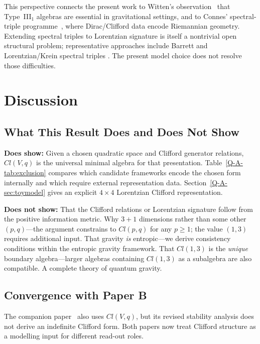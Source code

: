 \documentclass[12pt,a4paper,openany]{book}
\begin{document}
This perspective connects the present work to Witten's observation~\cite{Witten2018} that Type~III$_1$ algebras are essential in gravitational settings, and to Connes' spectral-triple programme~\cite{Connes1994}, where Dirac/Clifford data encode Riemannian geometry.  Extending spectral triples to Lorentzian signature is itself a nontrivial open structural problem; representative approaches include Barrett and Lorentzian/Krein spectral triples \cite{Barrett2007,PaschkeSitarz2006,VandenDungen2016}.  The present model choice does not resolve those difficulties.

\section{Discussion}
\label{Q-A-sec:discussion}

\subsection{What This Result Does and Does Not Show}

\textbf{Does show:}
Given a chosen quadratic space and Clifford generator relations, $Cl(V,q)$ is the universal minimal algebra for that presentation.
Table~\ref{Q-A-tab:exclusion} compares which candidate frameworks encode the chosen form internally and which require external representation data.
Section~\ref{Q-A-sec:toymodel} gives an explicit $4\times4$ Lorentzian Clifford representation.

\textbf{Does not show:}
That the Clifford relations or Lorentzian signature follow from the positive information metric.
Why $3+1$ dimensions rather than some other $(p,q)$---the argument constrains to $Cl(p,q)$ for any $p \geq 1$; the value $(1,3)$ requires additional input.
That gravity \emph{is} entropic---we derive consistency conditions within the entropic gravity framework.
That $Cl(1,3)$ is the \emph{unique} boundary algebra---larger algebras containing $Cl(1,3)$ as a subalgebra are also compatible.
A complete theory of quantum gravity.

\subsection{Convergence with Paper B}

The companion paper~\cite{Liu2026QRAIF_B} also uses $Cl(V,q)$, but its revised stability analysis does not derive an indefinite Clifford form.  Both papers now treat Clifford structure as a modelling input for different read-out roles.
\end{document}

